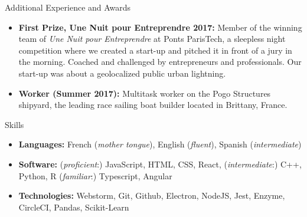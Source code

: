 \documentclass[]{mcdowellcv}
\begin{document}
    \begin{cvsection}{Additional Experience and Awards}
        \begin{cvsubsection}{}{}{}
            \begin{itemize}

                \item \textbf{First Prize, Une Nuit pour Entreprendre 2017:} Member of the winning team of \textit{Une Nuit pour Entreprendre} at Ponts ParisTech, a sleepless
                night competition where we created a start-up and pitched it in front of a jury in the morning.
                Coached and challenged by entrepreneurs and professionals.
                Our start-up was about a geolocalized public urban lightning.

                \item \textbf{Worker (Summer 2017):} Multitask worker on the Pogo Structures shipyard, the leading race sailing boat builder located in Brittany, France.

            \end{itemize}
        \end{cvsubsection}
    \end{cvsection}

    \begin{cvsection}{Skills}
        \begin{cvsubsection}{}{}{}
            \begin{itemize}
                \item \textbf{Languages:} French (\textit{mother tongue}), English (\textit{fluent}), Spanish (\textit{intermediate})
                \item \textbf{Software:} (\textit{proficient}:) JavaScript, HTML, CSS, React, (\textit{intermediate}:) C++, Python, R (\textit{familiar}:) Typescript, Angular
                \item \textbf{Technologies:} Webstorm, Git, Github, Electron, NodeJS, Jest, Enzyme, CircleCI, Pandas, Scikit-Learn
            \end{itemize}
        \end{cvsubsection}
    \end{cvsection}
\end{document}
